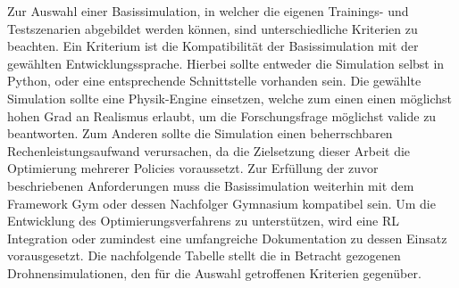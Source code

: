 Zur Auswahl einer Basissimulation, in welcher die eigenen Trainings- und Testszenarien abgebildet werden können, sind unterschiedliche Kriterien zu beachten.
Ein Kriterium ist die Kompatibilität der Basissimulation mit der gewählten Entwicklungssprache. 
Hierbei sollte entweder die Simulation selbst in Python, oder eine entsprechende Schnittstelle vorhanden sein.
Die gewählte Simulation sollte eine Physik-Engine einsetzen, welche zum einen einen möglichst hohen Grad an Realismus erlaubt, um die Forschungsfrage möglichst valide zu beantworten.
Zum Anderen sollte die Simulation einen beherrschbaren Rechenleistungsaufwand verursachen, da die Zielsetzung dieser Arbeit die Optimierung mehrerer Policies voraussetzt.
Zur Erfüllung der zuvor beschriebenen Anforderungen muss die Basissimulation weiterhin mit dem Framework Gym oder dessen Nachfolger Gymnasium kompatibel sein.
Um die Entwicklung des Optimierungsverfahrens zu unterstützen, wird eine RL Integration oder zumindest eine umfangreiche Dokumentation zu dessen Einsatz vorausgesetzt.
Die nachfolgende Tabelle stellt die in Betracht gezogenen Drohnensimulationen, den für die Auswahl getroffenen Kriterien gegenüber.

